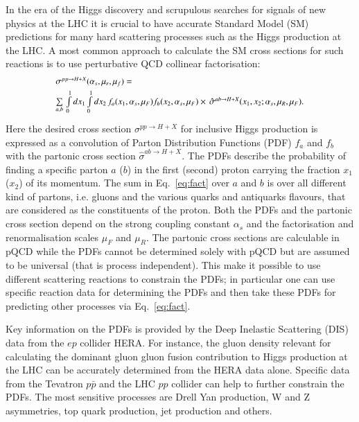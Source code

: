 In the era of the Higgs discovery and scrupulous searches
for signals of new physics at the LHC it is crucial
to have accurate Standard Model (SM) predictions for
many hard scattering processes such as the Higgs production at the LHC.
A most common approach to calculate the SM cross sections for  
such reactions is to use perturbative QCD collinear factorisation:
\begin{equation}
\small
\begin{array}{l}
\sigma^{pp\rightarrow H + X}(\alpha_s,\mu_r,\mu_f) = \\[1mm] 
\sum\limits_{a,b}\,  \int\limits_{0}\limits^{1} dx_1 \int\limits_{0}\limits^{1} dx_2\, f_a(x_1,\alpha_s,\mu_F) 
 f_b(x_2,\alpha_s,\mu_F) 
\times \, \hat{\sigma}^{ab \rightarrow H + X}(x_1,x_2;\alpha_s,\mu_R,\mu_F).\\[3mm]
\end{array}
\label{eq:fact}
\end{equation}
Here the desired cross section $\sigma^{pp\rightarrow H + X}$ for inclusive
Higgs production is expressed
as a convolution of Parton Distribution Functions (PDF) $f_a$ and $f_b$
with the partonic cross section
$\hat{\sigma}^{ab \rightarrow H + X}$.
%
The PDFs describe 
the probability of finding a specific parton $a$ ($b$) in the first (second) proton
carrying the fraction $x_1$ ($x_2$) of its momentum.
%
The sum in Eq.~\ref{eq:fact} over $a$ and $b$ is over all different kind of partons,
i.e. gluons and the various quarks and antiquarks flavours, that are considered
as the constituents of the proton.
%
Both the PDFs and the partonic cross section depend on the strong coupling
constant $\alpha_s$ and the factorisation and renormalisation scales
$\mu_F$ and $\mu_R$.
%
The partonic cross sections are calculable in pQCD while
the PDFs cannot be determined solely with pQCD but are assumed 
to be universal (that is process independent).
%
This make it possible to use different scattering reactions 
to constrain the PDFs; in particular one can use specific reaction data 
for determining the PDFs and then take these PDFs for
predicting other processes via Eq.~\ref{eq:fact}.
%

Key information on the PDFs is provided by the Deep Inelastic Scattering (DIS) data 
from the $ep$ collider HERA.
%
For instance, the gluon density relevant
for calculating the dominant gluon gluon fusion contribution to Higgs production
at the LHC can be accurately determined from the HERA data alone.
%
Specific data from the Tevatron $p\bar{p}$ and the LHC $pp$ collider
can help to further constrain the PDFs.
%
The most sensitive processes are
Drell Yan production, W and Z asymmetries, top quark production, jet production
and  others.
%

